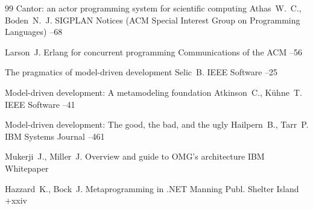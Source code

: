 \begin{thebibliography}{99}
\paper Cantor: an actor programming system for scientific computing  
\by Athas~W.~C., Boden~N.~J.
\jour SIGPLAN Notices (ACM Special Interest Group on Programming Languages)
--68

\by Larson~J.
\paper Erlang for concurrent programming 
\jour Communications of the ACM
--56

\paper The pragmatics of model-driven development  
\by Selic~B.
\jour IEEE Software
--25

\paper Model-driven development: A metamodeling foundation  
\by Atkinson~C., K\"uhne~T.
\jour IEEE Software
--41

\paper Model-driven development: The good, the bad, and the ugly  
\by Hailpern~B., Tarr~P.
\jour IBM Systems Journal
--461

\by Mukerji~J., Miller~J.
\preprint Overview and guide to OMG's architecture 
\preprintinfo IBM Whitepaper

\by Hazzard~K., Bock~J.
\book Metaprogramming in .NET
\publ Manning Publ.
\publaddr Shelter Island
+xxiv

\end{thebibliography}

\EngDate

\newpage \Russian


%
